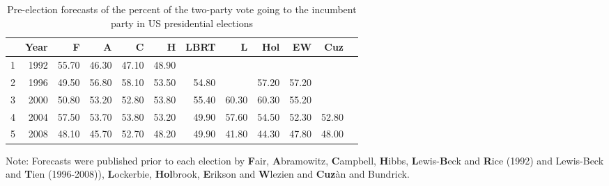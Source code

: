 \documentclass[12pt,fullpage,endnotes]{article}
\begin{document}
\begin{table}[ht]
\caption{Pre-election forecasts of the percent of the two-party vote going to the incumbent party in US presidential elections}
\label{tab:one}
\footnotesize
\begin{center}
\begin{tabular}{rrrrrrrrrrrr}
  \toprule
 & Year & F & A & C & H & LBRT & L & Hol & EW & Cuz  \\ 
  \midrule
1 & 1992 & 55.70 & 46.30 & 47.10 & 48.90 &  &  &  &  &   \\ 
  2 & 1996 & 49.50 & 56.80 & 58.10 & 53.50 & 54.80 &  & 57.20 & 57.20 &   \\ 
  3 & 2000 & 50.80 & 53.20 & 52.80 & 53.80 & 55.40 & 60.30 & 60.30 & 55.20 &   \\ 
  4 & 2004 & 57.50 & 53.70 & 53.80 & 53.20 & 49.90 & 57.60 & 54.50 & 52.30 & 52.80  \\ 
  5 & 2008 & 48.10 & 45.70 & 52.70 & 48.20 & 49.90 & 41.80 & 44.30 & 47.80 & 48.00  \\ 
   \bottomrule
%
\end{tabular}
\end{center}
Note: Forecasts were published prior to each election by
\textbf{F}air, \textbf{A}bramowitz, \textbf{C}ampbell, \textbf{H}ibbs,
\textbf{L}ewis-\textbf{B}eck and \textbf{R}ice (1992) and Lewis-Beck and \textbf{T}ien  (1996-2008)),   \textbf{L}ockerbie, \textbf{Hol}brook, \textbf{E}rikson and \textbf{W}lezien and \textbf{Cuz}\`an and Bundrick. 
\end{table}
\end{document}
